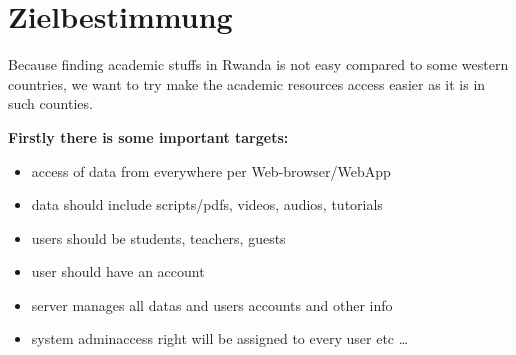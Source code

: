 \chapter{Zielbestimmung}

Because finding academic stuffs in Rwanda is not easy compared to some western countries, we want to try make the academic resources access easier as it is in such counties.

\textbf{Firstly there is some important targets:} 
\begin{itemize}  
	\item access of data from everywhere per Web-browser/WebApp 
	\item data should include scripts/pdfs, videos, audios, tutorials 
	\item users should be students, teachers, guests
	\item user should have an account
	\item server manages all datas and users accounts and other info
	\item system admin\/access right will be assigned to every user etc \ldots 
\end{itemize}